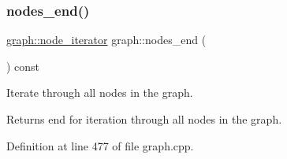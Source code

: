 \subsubsection{\texorpdfstring{nodes\+\_\+end()}{nodes\_end()}}
{\footnotesize\ttfamily \mbox{\hyperlink{classgraph_a2cb374b84c133ce13f94e73c3e5da7fa}{graph\+::node\+\_\+iterator}} graph\+::nodes\+\_\+end (\begin{DoxyParamCaption}{ }\end{DoxyParamCaption}) const}

Iterate through all nodes in the graph.

\begin{DoxyReturn}{Returns}
end for iteration through all nodes in the graph. 
\end{DoxyReturn}


Definition at line 477 of file graph.\+cpp.


